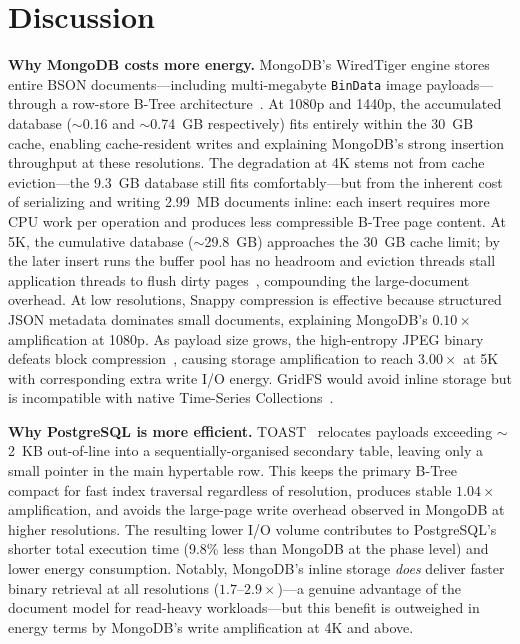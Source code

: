 \documentclass[conference]{IEEEtran}
\begin{document}
\section{Discussion}
\label{sec:discussion}

\textbf{Why MongoDB costs more energy.} MongoDB's WiredTiger engine stores entire BSON documents---including multi-megabyte \texttt{BinData} image payloads---through a row-store B-Tree architecture~\cite{mongodb_bson_spec,mongodb_wiredtiger_storage,wiredtiger_btree_architecture}. At 1080p and 1440p, the accumulated database ($\sim$0.16 and $\sim$0.74~GB respectively) fits entirely within the 30~GB cache, enabling cache-resident writes and explaining MongoDB's strong insertion throughput at these resolutions. The degradation at 4K stems not from cache eviction---the 9.3~GB database still fits comfortably---but from the inherent cost of serializing and writing 2.99~MB documents inline: each insert requires more CPU work per operation and produces less compressible B-Tree page content. At 5K, the cumulative database ($\sim$29.8~GB) approaches the 30~GB cache limit; by the later insert runs the buffer pool has no headroom and eviction threads stall application threads to flush dirty pages~\cite{percona_wiredtiger_eviction}, compounding the large-document overhead. At low resolutions, Snappy compression is effective because structured JSON metadata dominates small documents, explaining MongoDB's $0.10\times$ amplification at 1080p. As payload size grows, the high-entropy JPEG binary defeats block compression~\cite{mongodb_wiredtiger_storage}, causing storage amplification to reach $3.00\times$ at 5K with corresponding extra write I/O energy. GridFS would avoid inline storage but is incompatible with native Time-Series Collections~\cite{mongodb_ts_limitations}.

\textbf{Why PostgreSQL is more efficient.} TOAST~\cite{postgresql_toast_docs} relocates payloads exceeding $\sim$2~KB out-of-line into a sequentially-organised secondary table, leaving only a small pointer in the main hypertable row. This keeps the primary B-Tree compact for fast index traversal regardless of resolution, produces stable $1.04\times$ amplification, and avoids the large-page write overhead observed in MongoDB at higher resolutions. The resulting lower I/O volume contributes to PostgreSQL's shorter total execution time (9.8\% less than MongoDB at the phase level) and lower energy consumption. Notably, MongoDB's inline storage \emph{does} deliver faster binary retrieval at all resolutions ($1.7$--$2.9\times$)---a genuine advantage of the document model for read-heavy workloads---but this benefit is outweighed in energy terms by MongoDB's write amplification at 4K and above.
\end{document}
